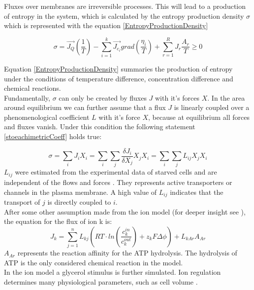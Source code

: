Fluxes over membranes are irreversible processes. This will lead to a production of entropy in the system, which is calculated by the entropy production density $\sigma$ which is represented with the equation \ref{EntropyProductionDensity}

\begin{equation}\label{EntropyProductionDensity}
	\sigma = \vec{J_Q}\left(\frac{1}{T}\right) - \sum_{i=1}^{k}\vec{J_{c_i}}grad \left(\frac{\eta _i}{T}\right) + \sum_{r=1}^{R}J_r \frac{A_r}{T} \geq 0
\end{equation}

Equation \ref{EntropyProductionDensity} summaries the production of entropy under the conditions of temperature difference, concentration difference and chemical reactions. \\
Fundamentally, $\sigma$ can only be created by fluxes $J$ with it’s forces $X$. In the area around equilibrium we can further assume that a flux $J$ is linearly coupled over a phenomenological coefficient $L$ with it’s force $X$, because at equilibrium all forces and fluxes vanish. Under this condition the following statement \ref{stoeachimetricCoeff} holds true:

\begin{equation}\label{stoeachimetricCoeff}
	\sigma = \sum_{i}J_i X_i = \sum_{i}\sum_{j} \frac{\delta J_i}{\delta X_j}X_j X_i= \sum_{i}\sum_{j}L_{ij}X_j X_i
\end{equation}
$L_{ij}$ were estimated from the experimental data of starved cells and are independent of the flows and forces \cite{Gerber_2016}. They represents active transporters or channels in the plasma membrane. A high value of $L_{ij}$ indicates that the transport of $j$ is directly coupled to $i$. \\
After some other assumption made from the ion model (for deeper insight see \cite{Gerber_2016}), the equation for the flux of ion k is:
\begin{equation}\label{IonFlux}
J_k = \sum_{j=1}^n L_{kj}(RT\cdot ln\left(\frac{c_k^{in}}{c_k^{out}}\right) + z_kF\Delta \phi ) + L_{kAr}A_{Ar}
\end{equation}
$A_{Ar}$ represents the reaction affinity for the ATP hydrolysis. The hydrolysis of ATP is the only considered chemical reaction in the model.\\
In the ion model a glycerol stimulus is further simulated. Ion regulation determines many physiological parameters, such as cell volume \cite{Ke_2013}.


